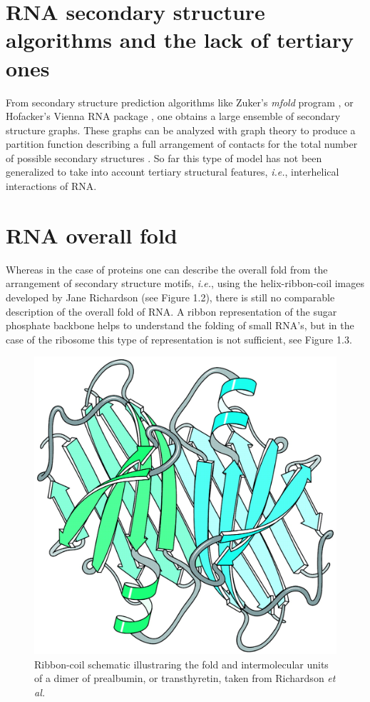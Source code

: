 \section{RNA secondary structure algorithms and the lack of tertiary ones}
From secondary structure prediction algorithms like Zuker's
\textit{mfold} program \cite{zuker2003}, or Hofacker's Vienna RNA
package \cite{hofacker1994}, one obtains a large ensemble of
secondary structure graphs. These graphs can be analyzed with graph
theory to produce a partition function describing a full arrangement
of contacts for the total number of possible secondary structures
\cite{chen2000}. So far this type of model has not been generalized
to take into account tertiary structural features, \textit{i.e.},
interhelical interactions of RNA.

\section{RNA overall fold}
Whereas in the case of proteins one can describe the overall fold
from the arrangement of secondary structure motifs, \textit{i.e.}, using the
helix-ribbon-coil images developed by Jane Richardson
\cite{richardson2000} (see Figure 1.2), there is still no comparable
description of the overall fold of RNA. A ribbon
representation of the sugar phosphate backbone helps to understand the
folding of small RNA's, but in the case of the ribosome this type of 
representation is not sufficient, see Figure 1.3.

\begin{figure}[ht]
\centering
\includegraphics[scale=0.4]{Chapter1/overallfold.png}
\caption{Ribbon-coil schematic illustraring the fold and
  intermolecular units of a dimer of prealbumin, or
transthyretin, taken from Richardson \textit{et al.} \cite{richardson2002}}
\end{figure}

